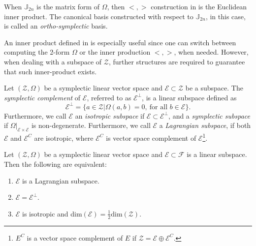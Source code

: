 \begin{corollary} \label{theorem:2.12}
When $\mathbb J_{2n}$ is the matrix form of $\Omega$, then $<,>$ construction in  is the Euclidean inner product. The canonical basis constructed with respect to $\mathbb J_{2n}$, in this case, is called an \emph{ortho-symplectic} basis.
\end{corollary}

An inner product defined in  is especially useful since one can switch between computing the 2-form $\Omega$ or the inner production $<,>$, when needed. However, when dealing with a subspace of $\mathcal Z$, further structures are required to guarantee that such inner-product exists.

\begin{definition} \cite{abraham1978foundations}
Let $(\mathcal Z, \Omega)$ be a symplectic linear vector space and $\mathcal E \subset \mathcal Z$ be a subspace. The \emph{symplectic complement} of $\mathcal E$, referred to as $\mathcal E^{\perp}$, is a linear subspace defined as
\begin{equation*}
	\mathcal E^{\perp} = \{ a \in \mathcal Z | \Omega(a,b) = 0, \ \text{for all } b \in \mathcal E \}.
\end{equation*}
Furthermore, we call $\mathcal E$ an \emph{isotropic subspace} if $\mathcal E\subset \mathcal E^{\perp}$, and a \emph{symplectic subspace} if $\Omega|_{\mathcal E\times \mathcal E}$ is non-degenerate. Furthermore, we call $\mathcal E$ a \emph{Lagrangian subspace}, if both $\mathcal E$ and $\mathcal E^C$ are isotropic, where $\mathcal E^C$ is vector space complement of $\mathcal E$\footnote{$E^{C}$ is a vector space complement of $E$ if $\mathcal{Z} = \mathcal E\oplus \mathcal E^C$. }.
\end{definition}
\begin{proposition} \label{theorem:2.13} \cite{abraham1978foundations}
Let $(\mathcal Z, \Omega)$ be a symplectic linear vector space and $\mathcal E\subset \mathcal F$ is a linear subspace. Then the following are equivalent:
\begin{enumerate} [label=(\alph*)]
\item $\mathcal E$ is a Lagrangian subspace.
\item $\mathcal E = \mathcal E^{\perp}$.
\item $\mathcal E$ is isotropic and dim$(\mathcal E) = \frac 1 2 \text{dim}(\mathcal Z)$.
\end{enumerate}
\end{proposition}
